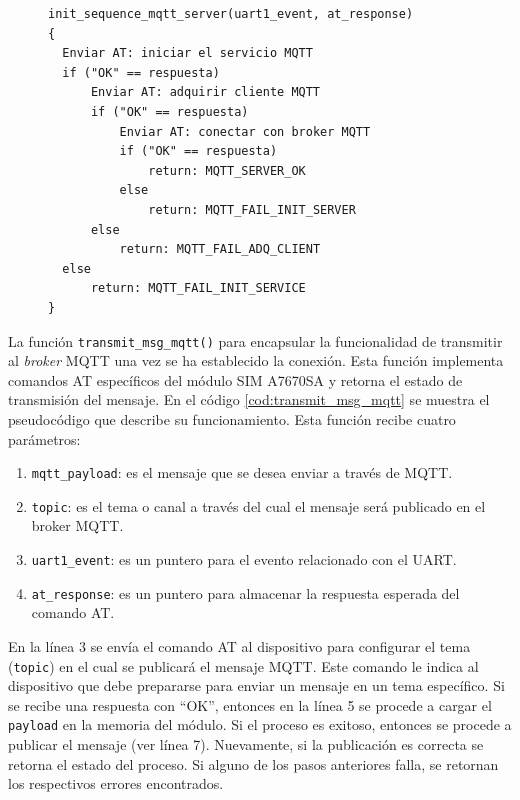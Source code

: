 \begin{figure}[H]
\begin{lstlisting}
init_sequence_mqtt_server(uart1_event, at_response)
{
  Enviar AT: iniciar el servicio MQTT
  if ("OK" == respuesta)
      Enviar AT: adquirir cliente MQTT
      if ("OK" == respuesta)
          Enviar AT: conectar con broker MQTT
	      if ("OK" == respuesta)
	          return: MQTT_SERVER_OK
	      else 
	          return: MQTT_FAIL_INIT_SERVER
      else
          return: MQTT_FAIL_ADQ_CLIENT
  else
      return: MQTT_FAIL_INIT_SERVICE	
}

\end{lstlisting}
\label{cod:init_sequence_mqtt_server}
 \end{figure}

La función \verb|transmit_msg_mqtt()| para encapsular la funcionalidad de transmitir al \textit{broker} MQTT una vez se ha establecido la conexión. Esta función implementa comandos AT específicos del módulo SIM A7670SA y retorna el estado de transmisión del mensaje. En el código \ref{cod:transmit_msg_mqtt} se muestra el pseudocódigo que describe su funcionamiento. Esta función recibe cuatro parámetros: 
\begin{enumerate}
\item \verb|mqtt_payload|: es el mensaje que se desea enviar a través de MQTT.
\item \verb|topic|: es el tema o canal a través del cual el mensaje será publicado en el broker MQTT.
\item \verb|uart1_event|: es un puntero para el evento relacionado con el UART.
\item \verb|at_response|: es un puntero para almacenar la respuesta esperada del comando AT.
\end{enumerate}

En la línea 3 se envía el comando AT al dispositivo para configurar el tema (\verb|topic|) en el cual se publicará el mensaje MQTT. Este comando le indica al dispositivo que debe prepararse para enviar un mensaje en un tema específico. Si se recibe una respuesta con ``OK'', entonces en la línea 5 se procede a cargar el \verb|payload| en la memoria del módulo. Si el proceso es exitoso, entonces se procede a publicar el mensaje (ver línea 7). Nuevamente, si la publicación es correcta se retorna el estado del proceso. Si alguno de los pasos anteriores falla, se retornan los respectivos errores encontrados. 


